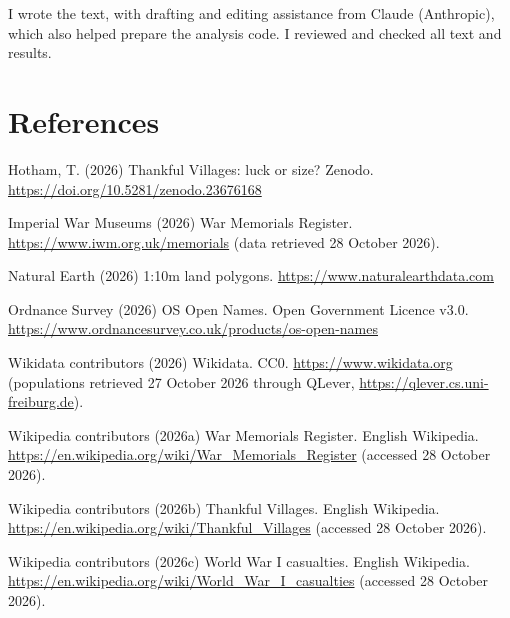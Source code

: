\documentclass[11pt,a4paper]{article}
\begin{document}
I wrote the text, with drafting and editing assistance from Claude (Anthropic), which also helped prepare the analysis code. I reviewed and checked all text and results.

\section*{References}
\small
Hotham, T. (2026) Thankful Villages: luck or size? Zenodo. \url{https://doi.org/10.5281/zenodo.23676168}

Imperial War Museums (2026) War Memorials Register. \url{https://www.iwm.org.uk/memorials} (data retrieved 28 October 2026).

Natural Earth (2026) 1:10m land polygons. \url{https://www.naturalearthdata.com}

Ordnance Survey (2026) OS Open Names. Open Government Licence v3.0. \url{https://www.ordnancesurvey.co.uk/products/os-open-names}

Wikidata contributors (2026) Wikidata. CC0. \url{https://www.wikidata.org} (populations retrieved 27 October 2026 through QLever, \url{https://qlever.cs.uni-freiburg.de}).

Wikipedia contributors (2026a) War Memorials Register. English Wikipedia. \url{https://en.wikipedia.org/wiki/War_Memorials_Register} (accessed 28 October 2026).

Wikipedia contributors (2026b) Thankful Villages. English Wikipedia. \url{https://en.wikipedia.org/wiki/Thankful_Villages} (accessed 28 October 2026).

Wikipedia contributors (2026c) World War I casualties. English Wikipedia. \url{https://en.wikipedia.org/wiki/World_War_I_casualties} (accessed 28 October 2026).
\end{document}
